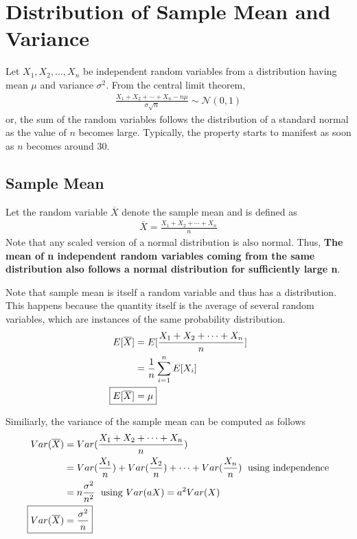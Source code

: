 \documentclass[../probability-notes.tex]{subfiles}
\begin{document}
    \section{Distribution of Sample Mean and Variance}
    Let $X_{1}, X_{2}, \ldots, X_{n}$ be independent random variables from a distribution having mean $\mu$ and variance $\sigma^{2}$. From the central limit theorem,
    \begin{align*}
        \frac{X_{1} + X_{2} + \cdots + X_{n} - n\mu}{\sigma \sqrt{n}} \sim \mathcal{N}(0, 1)
    \end{align*}
    or, the sum of the random variables follows the distribution of a standard normal as the value of $n$ becomes large. Typically, the property starts to manifest as soon as $n$ becomes around 30.\newline

    \subsection{Sample Mean}
    Let the random variable $\overline{X}$ denote the sample mean and is defined as
    \begin{align*}
        \overline{X} = \frac{X_{1} + X_{2} + \cdots + X_{n}}{n}
    \end{align*}
    Note that any scaled version of a normal distribution is also normal. Thus, \textbf{The mean of n independent random variables coming from the same distribution also follows a normal distribution for sufficiently large n}.\newline

    Note that sample mean is itself a random variable and thus has a distribution. This happens because the quantity itself is the average of several random variables, which are instances of the same probability distribution.
    \begin{align}
        E[\overline{X}] &= E[\frac{X_{1} + X_{2} + \cdots + X_{n}}{n}]\\
        &= \frac{1}{n} \sum_{i=1}^{n} E[X_{i}]\\
        \Aboxed{E[\overline{X}] &= \mu}
    \end{align}

    Similiarly, the variance of the sample mean can be computed as follows
    \begin{align*}
        Var(\overline{X}) &= Var(\frac{X_{1} + X_{2} + \cdots + X_{n}}{n})\\
        &= Var(\frac{X_{1}}{n}) + Var(\frac{X_{2}}{n}) + \cdots + Var(\frac{X_{n}}{n}) \text{\; using independence}\\
        &= n \frac{\sigma^{2}}{n^{2}} \text{\; using $Var(aX) = a^{2}Var(X)$}\\
        \Aboxed{Var(\overline{X}) &= \frac{\sigma^{2}}{n}}
    \end{align*}
\end{document}
